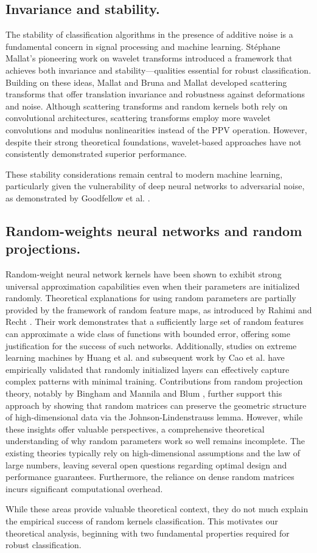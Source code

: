 \subsection{Invariance and stability.}


The stability of classification algorithms in the presence of additive noise is a fundamental concern in signal processing and machine learning. Stéphane Mallat's pioneering work on wavelet transforms \cite{mallat2012wavelet} introduced a framework that achieves both invariance and stability—qualities essential for robust classification. Building on these ideas, Mallat \cite{mallat2012group} and Bruna and Mallat \cite{bruna2013invariant} developed scattering transforms that offer translation invariance and robustness against deformations and noise. Although scattering transforms and random kernels both rely on convolutional architectures, scattering transforms employ more  wavelet convolutions and modulus nonlinearities instead of the PPV operation. However, despite their strong theoretical foundations, wavelet-based approaches have not consistently demonstrated superior performance.

These stability considerations remain central to modern machine learning, particularly given the vulnerability of deep neural networks to adversarial noise, as demonstrated by Goodfellow et al. \cite{goodfellow2014explaining}.


\subsection{Random-weights neural networks and random projections.}

Random-weight neural network kernels have been shown to exhibit strong universal approximation capabilities even when their parameters are initialized randomly. Theoretical explanations for using random parameters are partially provided by the framework of random feature maps, as introduced by Rahimi and Recht \cite{rahimi2007random}. Their work demonstrates that a sufficiently large set of random features can approximate a wide class of functions with bounded error, offering some justification for the success of such networks. Additionally, studies on extreme learning machines by Huang et al. \cite{huang2006universal} and subsequent work by Cao et al. \cite{cao2018review} have empirically validated that randomly initialized layers can effectively capture complex patterns with minimal training. Contributions from random projection theory, notably by Bingham and Mannila \cite{bingham2001random} and Blum \cite{blum2005random}, further support this approach by showing that random matrices can preserve the geometric structure of high-dimensional data via the Johnson-Lindenstrauss lemma. However, while these insights offer valuable perspectives, a comprehensive theoretical understanding of why random parameters work so well remains incomplete. The existing theories typically rely on high-dimensional assumptions and the law of large numbers, leaving several open questions regarding optimal design and performance guarantees. Furthermore, the reliance on dense random matrices incurs significant computational overhead.

While these areas provide valuable theoretical context, they do not much explain the empirical success of random kernels classification. This motivates our theoretical analysis, beginning with two fundamental properties required for robust classification.